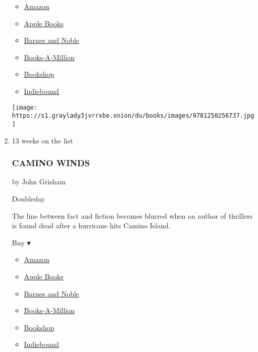 \begin{enumerate}
  \begin{itemize}
  \tightlist
  \item
    \href{https://www.amazon.com/dp/1250256739?tag=NYTBSREV-20\&tag=NYTBS-20}{Amazon}
  \item
    \href{https://du-gae-books-dot-nyt-du-prd.appspot.com/buy?title=AXIOM\%27S+END\&author=Lindsay+Ellis}{Apple
    Books}
  \item
    \href{https://www.anrdoezrs.net/click-7990613-11819508?url=https\%3A\%2F\%2Fwww.barnesandnoble.com\%2Fw\%2F\%3Fean\%3D9781250256737}{Barnes
    and Noble}
  \item
    \href{https://www.anrdoezrs.net/click-7990613-35140?url=https\%3A\%2F\%2Fwww.booksamillion.com\%2Fp\%2FAXIOM\%2527S\%2BEND\%2FLindsay\%2BEllis\%2F9781250256737}{Books-A-Million}
  \item
    \href{https://bookshop.org/a/3546/9781250256737}{Bookshop}
  \item
    \href{https://www.indiebound.org/book/9781250256737?aff=NYT}{Indiebound}
  \end{itemize}

  \texttt{[image: https://s1.graylady3jvrrxbe.onion/du/books/images/9781250256737.jpg]}
\item
  13 weeks on the list

  \hypertarget{camino-winds}{%
  \subsubsection{CAMINO WINDS}\label{camino-winds}}

  by John Grisham

  Doubleday

  The line between fact and fiction becomes blurred when an author of
  thrillers is found dead after a hurricane hits Camino Island.

  Buy ▾

  \begin{itemize}
  \tightlist
  \item
    \href{https://www.amazon.com/dp/0385545932?tag=NYTBSREV-20\&tag=NYTBS-20}{Amazon}
  \item
    \href{https://du-gae-books-dot-nyt-du-prd.appspot.com/buy?title=CAMINO+WINDS\&author=John+Grisham}{Apple
    Books}
  \item
    \href{https://www.anrdoezrs.net/click-7990613-11819508?url=https\%3A\%2F\%2Fwww.barnesandnoble.com\%2Fw\%2F\%3Fean\%3D9780385545938}{Barnes
    and Noble}
  \item
    \href{https://www.anrdoezrs.net/click-7990613-35140?url=https\%3A\%2F\%2Fwww.booksamillion.com\%2Fp\%2FCAMINO\%2BWINDS\%2FJohn\%2BGrisham\%2F9780385545938}{Books-A-Million}
  \item
    \href{https://bookshop.org/a/3546/9780385545938}{Bookshop}
  \item
    \href{https://www.indiebound.org/book/9780385545938?aff=NYT}{Indiebound}
  \end{itemize}


\end{enumerate}
